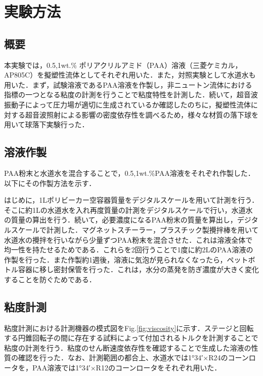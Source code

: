 \section{実験方法}
\label{sec:methods}
\subsection{概要}
本実験では，0.5,1wt.\% ポリアクリルアミド（PAA）溶液（三菱ケミカル，AP805C）を擬塑性流体としてそれぞれ用いた．また，対照実験として水道水も用いた．まず，試験溶液であるPAA溶液を作製し，非ニュートン流体における指標の一つとなる粘度の計測を行うことで粘度特性を計測した．続いて，超音波振動子によって圧力場が適切に生成されているか確認したのちに，擬塑性流体に対する超音波照射による影響の密度依存性を調べるため，様々な材質の落下球を用いて球落下実験行った．

\subsection{溶液作製}

PAA粉末と水道水を混合することで，0.5,1wt.\%PAA溶液をそれぞれ作製した．以下にその作製方法を示す．

はじめに，1Lポリビーカー空容器質量をデジタルスケールを用いて計測を行う．そこに約1Lの水道水を入れ再度質量の計測をデジタルスケールで行い，水道水の質量の算出を行う．続いて，必要濃度になるPAA粉末の質量を算出し，デジタルスケールで計測した．マグネットスチーラー，プラスチック製攪拌棒を用いて水道水の攪拌を行いながら少量ずつPAA粉末を混合させた．これは溶液全体で均一性を持たせるためである．これらを2回行うことで1度に約2LのPAA溶液の作製を行った．また作製約1週後，溶液に気泡が見られなくなったら，ペットボトル容器に移し密封保管を行った．これは，水分の蒸発を防ぎ濃度が大きく変化することを防ぐためである．

\subsection{粘度計測}
粘度計測における計測機器の模式図をFig.\ref{fig:viscosity}に示す．ステージと回転する円錐回転子の間に存在する試料によって付加されるトルクを計測することで粘度の計測を行う．粘度のせん断速度依存性を確認することで生成した溶液の性質の確認を行った．なお、計測範囲の都合上、水道水では1°34′×R24のコーンロータを，PAA溶液では1°34′×R12のコーンロータをそれぞれ用いた．

